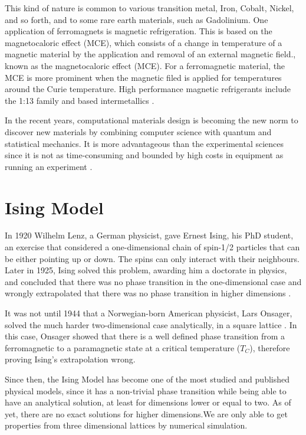 This kind of nature is common to various transition metal, Iron, Cobalt, Nickel, and so forth, and to some rare earth materials, such as Gadolinium.
One application of ferromagnets is magnetic refrigeration. This is based on the magnetocaloric effect (MCE), which consists of a change in temperature of a magnetic material by the application and removal of an external magnetic field., known as the magnetocaloric effect (MCE). For a ferromagnetic material, the MCE is more prominent when the magnetic filed is applied for temperatures around the Curie temperature. 
High performance magnetic refrigerants include the  1:13 family \cite{Fujita} and  based intermetallics \cite{Bruck}. 

In the recent years, computational materials design is becoming the new norm to discover new materials by combining computer science with quantum and statistical mechanics. It is more advantageous than the experimental sciences since it is not as time-consuming and bounded by high costs in equipment as running an experiment \cite{Curtarolo2013,Chen2019, Sanvito2017}. 

\section{Ising Model}

In 1920 Wilhelm Lenz, a German physicist, gave Ernest Ising, his PhD student, an exercise that considered a one-dimensional chain of spin-1/2 particles that can be either pointing up or down. The spins can only interact with their neighbours. Later in 1925, Ising solved this problem, awarding him a doctorate in physics,  and concluded that there was no phase transition in the one-dimensional case and wrongly extrapolated that there was no phase transition in higher dimensions \cite{Ising1925}.

It was not until 1944 that a Norwegian-born American physicist, Lars Onsager, solved the much harder two-dimensional case analytically, in a square lattice \cite{Onsager1944}. In this case, Onsager showed that there is a well defined phase transition from a ferromagnetic to a paramagnetic state at a critical temperature ($T_C$), therefore proving Ising's extrapolation wrong.

Since then, the Ising Model has become one of the most studied and published physical models, since it has a non-trivial phase transition while being able to have an analytical solution, at least for dimensions lower or equal to two. As of yet, there are no exact solutions for higher dimensions.We are only able to get properties from three dimensional lattices by numerical simulation.

